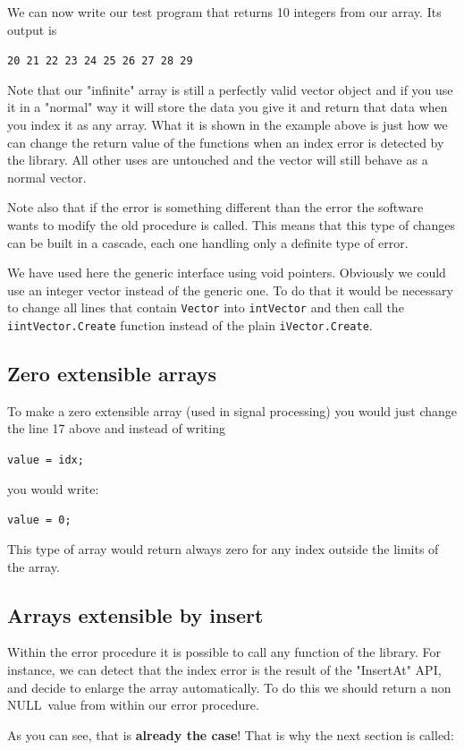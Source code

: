 \documentclass[12pt,a4paper,openany]{memoir} %
\newif\iftth
\newcommand{\Null}{{\iftth \ NULL \else \footnotesize NULL\  \fi}}
\begin{document}
{{We can now write our test program that returns 10 integers from our array. Its output is\par
\verb,20 21 22 23 24 25 26 27 28 29 ,

Note that our "infinite" array is still a perfectly valid vector object and if you use it in a "normal" way it will store the data you give it and 
return that data when you index it as any array. What it is shown in the example above is just how we can change the return value of the functions when 
an index error is detected by the library. All other uses are untouched and the vector will still behave as a normal vector.

Note also that if the error is something different than the error the software wants to modify the old procedure is called. This means that
this type of changes can be built in a cascade, each one handling only a definite type of error.

We have used here the generic interface using void pointers. Obviously we could use an integer vector instead of the generic one. To do that it would 
be necessary to change all lines that contain \verb,Vector, into \verb,intVector, and then call the \verb,iintVector.Create, function
instead of the plain \verb,iVector.Create,.

\subsection{Zero extensible arrays}
To make a zero extensible array (used in  signal processing) you would just change the line 17 above and instead of writing

\verb,value = idx;,

you would write:

\verb,value = 0;,

This type of array would return always zero for any index outside the limits of the array.
\subsection{Arrays extensible by insert}
Within the error procedure it is possible to call any function of the library. For instance, we can detect that the index error is the
result of the "InsertAt" API, and decide to enlarge the array automatically. To do this we should return a non \Null value from within  our
error procedure.

As you can see, that is \textbf{already the case}! That is why the next section is called:

}}
\end{document}
